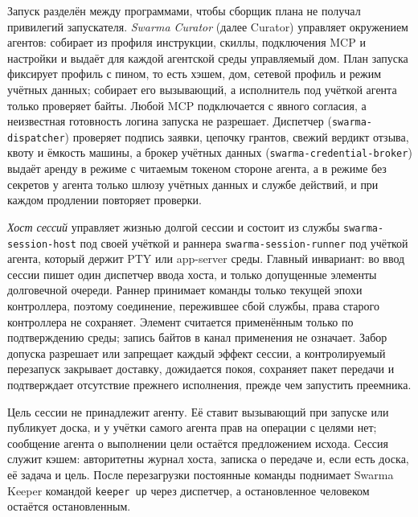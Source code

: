 \documentclass[10pt,a4paper]{article}
\begin{document}
Запуск разделён между программами, чтобы сборщик плана не получал привилегий запускателя. \emph{Swarma Curator} (далее Curator) управляет окружением агентов: собирает из профиля инструкции, скиллы, подключения MCP и настройки и выдаёт для каждой агентской среды управляемый дом. План запуска фиксирует профиль с пином, то есть хэшем, дом, сетевой профиль и режим учётных данных; собирает его вызывающий, а исполнитель под учёткой агента только проверяет байты. Любой MCP подключается с явного согласия, а неизвестная готовность логина запуска не разрешает. Диспетчер (\texttt{swarma-dispatcher}) проверяет подпись заявки, цепочку грантов, свежий вердикт отзыва, квоту и ёмкость машины, а брокер учётных данных (\texttt{swarma-credential-broker}) выдаёт аренду в режиме с читаемым токеном стороне агента, а в режиме без секретов у агента только шлюзу учётных данных и службе действий, и при каждом продлении повторяет проверки.

\emph{Хост сессий} управляет жизнью долгой сессии и состоит из службы \texttt{swarma-session-host} под своей учёткой и раннера \texttt{swarma-session-runner} под учёткой агента, который держит PTY или app-server среды. Главный инвариант: во ввод сессии пишет один диспетчер ввода хоста, и только допущенные элементы долговечной очереди. Раннер принимает команды только текущей эпохи контроллера, поэтому соединение, пережившее сбой службы, права старого контроллера не сохраняет. Элемент считается применённым только по подтверждению среды; запись байтов в канал применения не означает. Забор допуска разрешает или запрещает каждый эффект сессии, а контролируемый перезапуск закрывает доставку, дожидается покоя, сохраняет пакет передачи и подтверждает отсутствие прежнего исполнения, прежде чем запустить преемника.

Цель сессии не принадлежит агенту. Её ставит вызывающий при запуске или публикует доска, и у учётки самого агента прав на операции с целями нет; сообщение агента о выполнении цели остаётся предложением исхода. Сессия служит кэшем: авторитетны журнал хоста, записка о передаче и, если есть доска, её задача и цель. После перезагрузки постоянные команды поднимает Swarma Keeper командой \texttt{keeper up} через диспетчер, а остановленное человеком остаётся остановленным.
\end{document}
